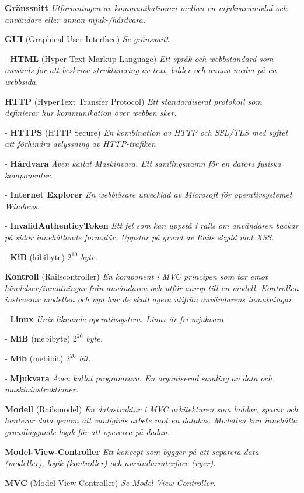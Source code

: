 \documentclass[a4paper, twoside, 11pt, titlepage]{article}
\begin{document}
	\textbf{Gränssnitt} \emph{Utformningen av kommunikationen mellan en mjukvarumodul och användare eller annan mjuk-/hårdvara.}

	\textbf{GUI} (Graphical User Interface) \emph{Se gränssnitt.}

	- \textbf{HTML} (Hyper Text Markup Language) \emph{Ett språk och webbstandard som används för att beskriva strukturering av text, bilder och annan media på en webbsida.}

	\textbf{HTTP} (HyperText Transfer Protocol) \emph{Ett standardiserat protokoll som definierar hur kommunikation över webben sker.}

	- \textbf{HTTPS} (HTTP Secure) \emph{En kombination av HTTP och SSL/TLS med syftet att förhindra avlyssning av HTTP-trafiken}

	- \textbf{Hårdvara} \emph{Även kallat Maskinvara. Ett samlingsnamn för en dators fysiska komponenter.}

	- \textbf{Internet Explorer} \emph{En webbläsare utvecklad av Microsoft för operativsystemet Windows.}

	- \textbf{InvalidAuthenticyToken} \emph{Ett fel som kan uppstå i rails om användaren backar på sidor innehållande formulär. Uppstår på grund av Rails skydd mot XSS.}

	- \textbf{KiB} (kibibyte) \emph{$2^{10}$ byte.}

	\textbf{Kontroll} (Railscontroller) \emph{En komponent i MVC principen som tar emot händelser/inmatningar från användaren och utför anrop till en modell. Kontrollen instruerar modellen och vyn hur de skall agera utifrån användarens inmatningar.}

	- \textbf{Linux} \emph{Unix-liknande operativsystem. Linux är fri mjukvara.}

	- \textbf{MiB} (mebibyte) \emph{$2^{20}$ byte.}

	- \textbf{Mib} (mebibit) \emph{$2^{20}$ bit.}

	- \textbf{Mjukvara} \emph{Även kallat programvara. En organiserad samling av data och maskininstruktioner.}

	\textbf{Modell} (Railsmodel) \emph{En datastruktur i MVC arkitekturen som laddar, sparar och hanterar data genom att vanligtvis arbete mot en databas. Modellen kan innehålla grundläggande logik för att opererea på dadan.}

	\textbf{Model-View-Controller} \emph{Ett koncept som bygger på att separera data (modeller), logik (kontroller) och användarinterface (vyer).}

	\textbf{MVC} (Model-View-Controller) \emph{Se Model-View-Controller.}
\end{document}
